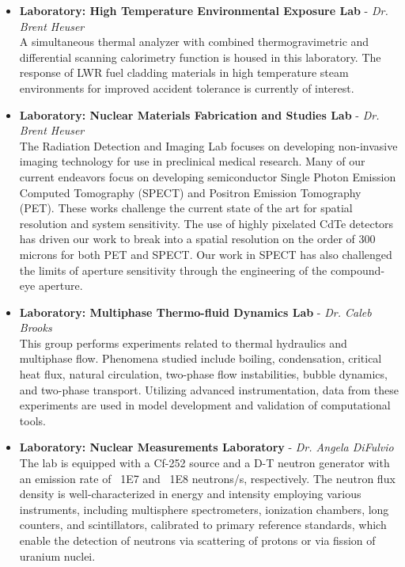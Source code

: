 \begin{itemize}
  \item \textbf{Laboratory: High Temperature Environmental Exposure Lab} - \textit{Dr. Brent Heuser}\\
  A simultaneous thermal analyzer with combined thermogravimetric and differential scanning calorimetry function is housed in this laboratory. The response of LWR fuel cladding materials in high temperature steam environments for improved accident tolerance is currently of interest.

  \item \textbf{Laboratory: Nuclear Materials Fabrication and Studies Lab} - \textit{Dr. Brent Heuser}\\
  The Radiation Detection and Imaging Lab focuses on developing non-invasive imaging technology for use in preclinical medical research. Many of our current endeavors focus on developing semiconductor Single Photon Emission Computed Tomography (SPECT) and Positron Emission Tomography (PET). These works challenge the current state of the art for spatial resolution and system sensitivity. The use of highly pixelated CdTe detectors has driven our work to break into a spatial resolution on the order of 300 microns for both PET and SPECT. Our work in SPECT has also challenged the limits of aperture sensitivity through the engineering of the compound-eye aperture.

  \item \textbf{Laboratory: Multiphase Thermo-fluid Dynamics Lab} - \textit{Dr. Caleb Brooks}\\
  This group performs experiments related to thermal hydraulics and multiphase flow. Phenomena studied include boiling, condensation, critical heat flux, natural circulation, two-phase flow instabilities, bubble dynamics, and two-phase transport. Utilizing advanced instrumentation, data from these experiments are used in model development and validation of computational tools.
  \item \textbf{Laboratory: Nuclear Measurements Laboratory} - \textit{Dr.  Angela DiFulvio}\\ The lab is equipped with a Cf-252 source and a D-T neutron generator with an emission rate of ~1E7 and ~1E8 neutrons/s, respectively. The neutron flux density is well-characterized in energy and intensity employing various instruments, including multisphere spectrometers, ionization chambers, long counters, and scintillators, calibrated to primary reference standards, which enable the detection of neutrons via scattering of protons or via fission of uranium nuclei.
\end{itemize}
